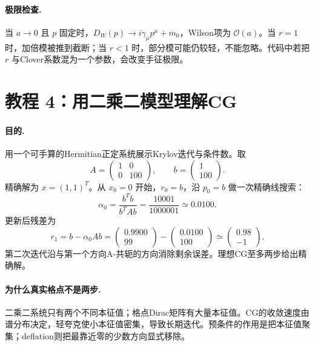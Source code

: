 \documentclass[UTF8,12pt,a4paper,twoside,openany]{ctexbook}
\begin{document}
\paragraph{极限检查.} 当 \(a\to0\) 且 \(p\) 固定时，\(D_W(p)\to i\gamma_\mu p^\mu+m_0\)，Wilson项为 \(\mathcal O(a)\)。当 \(r=1\) 时，加倍模被推到截断；当 \(r<1\) 时，部分模可能仍较轻，不能忽略。代码中若把 \(r\) 与Clover系数混为一个参数，会改变手征极限。

\section{教程 4：用二乘二模型理解CG}

\paragraph{目的.} 用一个可手算的Hermitian正定系统展示Krylov迭代与条件数。取
\begin{equation}
  A=\begin{pmatrix}1&0\\0&100\end{pmatrix},
  \qquad
  b=\begin{pmatrix}1\\100\end{pmatrix}.
  \label{eq:tutorial-cg-system}
\end{equation}
精确解为 \(x=(1,1)^T\)。从 \(x_0=0\) 开始，\(r_0=b\)，沿 \(p_0=b\) 做一次精确线搜索：
\begin{equation}
  \alpha_0=\frac{b^Tb}{b^TAb}
  =\frac{10001}{1000001}\simeq0.0100.
  \label{eq:tutorial-cg-alpha}
\end{equation}
更新后残差为
\begin{equation}
  r_1=b-\alpha_0Ab
  =\begin{pmatrix}0.9900\\99\end{pmatrix}-\begin{pmatrix}0.0100\\100\end{pmatrix}
  \simeq\begin{pmatrix}0.98\\-1\end{pmatrix}.
  \label{eq:tutorial-cg-residual}
\end{equation}
第二次迭代沿与第一个方向A-共轭的方向消除剩余误差。理想CG至多两步给出精确解。

\paragraph{为什么真实格点不是两步.} 二乘二系统只有两个不同本征值；格点Dirac矩阵有大量本征值。CG的收敛速度由谱分布决定，轻夸克使小本征值密集，导致长期迭代。预条件的作用是把本征值聚集；deflation则把最靠近零的少数方向显式移除。
\end{document}
